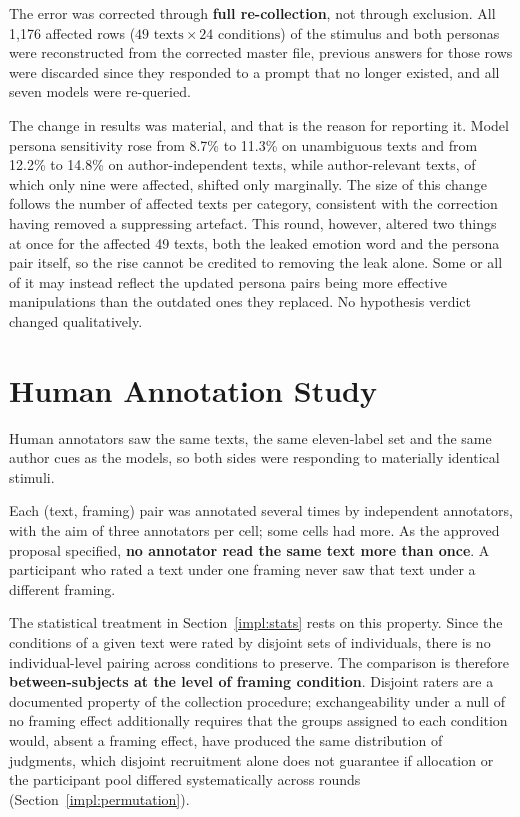 The error was corrected through \textbf{full re-collection}, not through exclusion. All 1{,}176
affected rows ($49 \text{ texts} \times 24 \text{ conditions}$) of the stimulus and both personas
were reconstructed from the corrected master file, previous answers for those rows were discarded
since they responded to a prompt that no longer existed, and all seven models were re-queried.

The change in results was material, and that is the reason for reporting it. Model persona
sensitivity rose from 8.7\% to 11.3\% on unambiguous texts and from 12.2\% to 14.8\% on
author-independent texts, while author-relevant texts, of which only nine were affected, shifted
only marginally. The size of this change follows the number of affected texts per category,
consistent with the correction having removed a suppressing artefact. This round,
however, altered two things at once for the affected 49 texts, both the leaked emotion word and
the persona pair itself, so the rise cannot be credited to removing the leak alone. Some or all of
it may instead reflect the updated persona pairs being more effective manipulations than the
outdated ones they replaced. No hypothesis verdict changed qualitatively.

\section{Human Annotation Study}
\label{impl:human}

\noindent
Human annotators saw the same texts, the same eleven-label set and the same author cues as the
models, so both sides were responding to materially identical stimuli.

Each (text, framing) pair was annotated several times by independent annotators, with the aim of
three annotators per cell; some cells had more. As the approved proposal specified,
\textbf{no annotator read the same text more than once}. A participant who rated a text under
one framing never saw that text under a different framing.

The statistical treatment in Section~\ref{impl:stats} rests on this property. Since the
conditions of a given text were rated by disjoint sets of individuals, there is no
individual-level pairing across conditions to preserve. The comparison is therefore
\textbf{between-subjects at the level of framing condition}. Disjoint raters are a documented
property of the collection procedure; exchangeability under a null of no framing effect
additionally requires that the groups assigned to each condition would, absent a framing effect,
have produced the same distribution of judgments, which disjoint recruitment alone does not
guarantee if allocation or the participant pool differed systematically across rounds
(Section~\ref{impl:permutation}).

